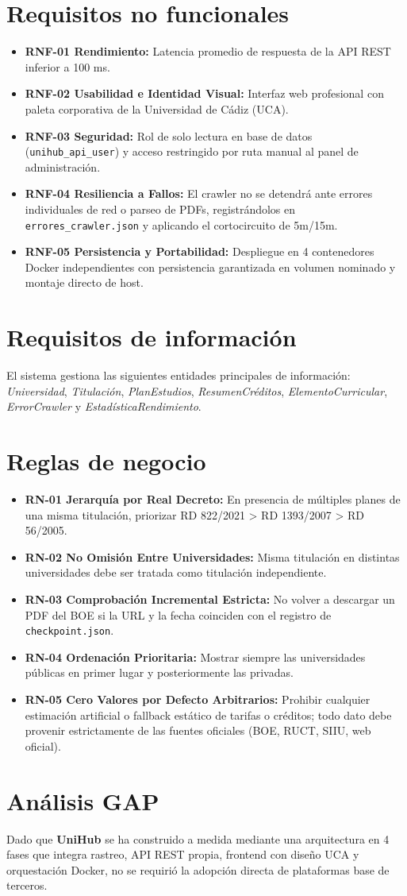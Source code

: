 \section{Requisitos no funcionales}
\begin{itemize}
    \item \textbf{RNF-01 Rendimiento:} Latencia promedio de respuesta de la API REST inferior a 100 ms.
    \item \textbf{RNF-02 Usabilidad e Identidad Visual:} Interfaz web profesional con paleta corporativa de la Universidad de Cádiz (UCA).
    \item \textbf{RNF-03 Seguridad:} Rol de solo lectura en base de datos (\texttt{unihub\_api\_user}) y acceso restringido por ruta manual al panel de administración.
    \item \textbf{RNF-04 Resiliencia a Fallos:} El crawler no se detendrá ante errores individuales de red o parseo de PDFs, registrándolos en \texttt{errores\_crawler.json} y aplicando el cortocircuito de 5m/15m.
    \item \textbf{RNF-05 Persistencia y Portabilidad:} Despliegue en 4 contenedores Docker independientes con persistencia garantizada en volumen nominado y montaje directo de host.
\end{itemize}

\section{Requisitos de información}
El sistema gestiona las siguientes entidades principales de información: \textit{Universidad}, \textit{Titulación}, \textit{PlanEstudios}, \textit{ResumenCréditos}, \textit{ElementoCurricular}, \textit{ErrorCrawler} y \textit{EstadísticaRendimiento}.

\section{Reglas de negocio}
\begin{itemize}
    \item \textbf{RN-01 Jerarquía por Real Decreto:} En presencia de múltiples planes de una misma titulación, priorizar RD 822/2021 > RD 1393/2007 > RD 56/2005.
    \item \textbf{RN-02 No Omisión Entre Universidades:} Misma titulación en distintas universidades debe ser tratada como titulación independiente.
    \item \textbf{RN-03 Comprobación Incremental Estricta:} No volver a descargar un PDF del BOE si la URL y la fecha coinciden con el registro de \texttt{checkpoint.json}.
    \item \textbf{RN-04 Ordenación Prioritaria:} Mostrar siempre las universidades públicas en primer lugar y posteriormente las privadas.
    \item \textbf{RN-05 Cero Valores por Defecto Arbitrarios:} Prohibir cualquier estimación artificial o fallback estático de tarifas o créditos; todo dato debe provenir estrictamente de las fuentes oficiales (BOE, RUCT, SIIU, web oficial).
\end{itemize}

\section{Análisis GAP}
Dado que \textbf{UniHub} se ha construido a medida mediante una arquitectura en 4 fases que integra rastreo, API REST propia, frontend con diseño UCA y orquestación Docker, no se requirió la adopción directa de plataformas base de terceros.
